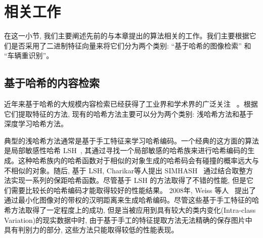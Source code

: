 \section{相关工作}
在这一小节, 我们主要阐述先前的与本章提出的算法相关的工作。我们主要根据它们是否采用了二进制特征向量来将它们分为两个类别: ``基于哈希的图像检索'' 和 ``车辆重识别''。
\subsection{基于哈希的内容检索}
近年来基于哈希的大规模内容检索已经获得了工业界和学术界的广泛关注~\cite{indyk1997locality, weiss2008spectral, gong2012iterative} \cite{heo2012spherical, jegou2010product, ge2013optimized, li2018deep}。根据它们提取特征的方法, 现有的哈希方法主要可以分为两个类别: 浅哈希方法和基于深度学习哈希方法。\par
典型的浅哈希方法通常是基于手工特征来学习哈希编码。一个经典的这方面的算法是局部敏感性哈希 LSH~\cite{indyk1997locality}, 其通过寻找一个局部敏感的哈希族来进行哈希编码的生成。这种哈希族内的哈希函数对于相似的对象生成的哈希码会有碰撞的概率远大与不相似的对象。随后, 基于 LSH, Charikar等人提出 SIMHASH~\cite{charikar2002similarity} 通过结合取整方法实现一系列的保距哈希函数。尽管基于 LSH 的方法取得了不错的性能, 但是它们需要比较长的哈希编码才能取得较好的性能结果。 2008年, Weiss 等人~\cite{weiss2008spectral} 提出了通过最小化图像对的带权的汉明距离来生成哈希编码。尽管这些基于手工特征的哈希方法取得了一定程度上的成功, 但是当被应用到具有较大的类内变化(Intra-class Variation)的现实数据中时, 由于基于手工的特征提取方法无法精确的保存图片中具有判别力的部分, 这些方法只能取得较低的性能表现。\par
